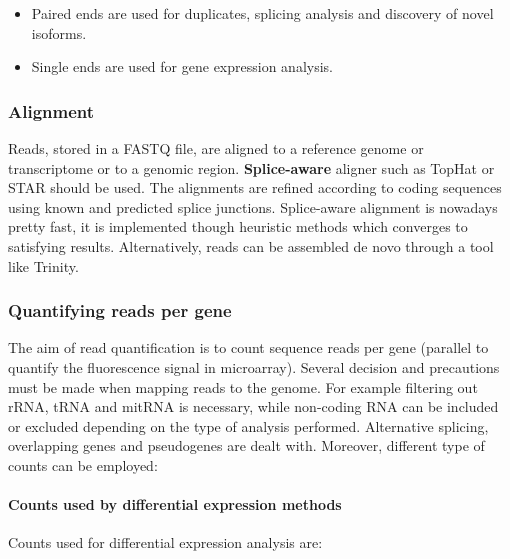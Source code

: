 		\begin{multicols}{2}
			\begin{itemize}
				\item Paired ends are used for duplicates, splicing analysis and discovery of novel isoforms.
				\item Single ends are used for gene expression analysis.
			\end{itemize}
		\end{multicols}

		\subsubsection{Alignment}
		Reads, stored in a FASTQ file, are aligned to a reference genome or transcriptome or to a genomic region.
		\textbf{Splice-aware} aligner such as TopHat or STAR should be used.
		The alignments are refined according to coding sequences using known and predicted splice junctions.
		Splice-aware alignment is nowadays pretty fast, it is implemented though heuristic methods which converges to satisfying results.
		Alternatively, reads can be assembled de novo through a tool like Trinity.

		\subsubsection{Quantifying reads per gene}
		The aim of read quantification is to count sequence reads per gene (parallel to quantify the fluorescence signal in microarray).
		Several decision and precautions must be made when mapping reads to the genome.
		For example filtering out rRNA, tRNA and mitRNA is necessary, while non-coding RNA can be included or excluded depending on the type of analysis performed.
		Alternative splicing, overlapping genes and pseudogenes are dealt with.
		Moreover, different type of counts can be employed:

			\paragraph{Counts used by differential expression methods}
			Counts used for differential expression analysis are:

